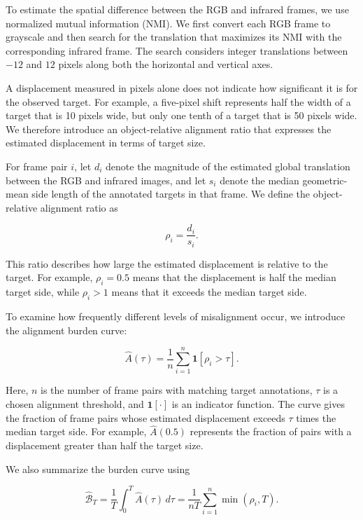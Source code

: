 \documentclass[10pt]{article}
\newcommand{\burden}{\widehat A}
\begin{document}
To estimate the spatial difference between the RGB and infrared frames, we use normalized mutual information (NMI). We first convert each RGB frame to grayscale and then search for the translation that maximizes its NMI with the corresponding infrared frame. The search considers integer translations between $-12$ and $12$ pixels along both the horizontal and vertical axes.

A displacement measured in pixels alone does not indicate how significant it is for the observed target. For example, a five-pixel shift represents half the width of a target that is 10 pixels wide, but only one tenth of a target that is 50 pixels wide. We therefore introduce an object-relative alignment ratio that expresses the estimated displacement in terms of target size.

For frame pair $i$, let $d_i$ denote the magnitude of the estimated global translation between the RGB and infrared images, and let $s_i$ denote the median geometric-mean side length of the annotated targets in that frame. We define the object-relative alignment ratio as

\begin{equation}
\rho_i=\frac{d_i}{s_i}.
\label{eq:rho}
\end{equation}

This ratio describes how large the estimated displacement is relative to the target. For example, $\rho_i=0.5$ means that the displacement is half the median target side, while $\rho_i>1$ means that it exceeds the median target side.

To examine how frequently different levels of misalignment occur, we introduce the alignment burden curve:

\begin{equation}
\burden(\tau)=\frac{1}{n}\sum_{i=1}^{n}\mathbf{1}[\rho_i>\tau].
\label{eq:burden}
\end{equation}

Here, $n$ is the number of frame pairs with matching target annotations, $\tau$ is a chosen alignment threshold, and $\mathbf{1}[\cdot]$ is an indicator function. The curve gives the fraction of frame pairs whose estimated displacement exceeds $\tau$ times the median target side. For example, $\burden(0.5)$ represents the fraction of pairs with a displacement greater than half the target size.

We also summarize the burden curve using

\begin{equation}
\widehat{\mathcal B}_T=\frac{1}{T}\int_0^T\burden(\tau)\,d\tau
=\frac{1}{nT}\sum_{i=1}^n\min(\rho_i,T).
\label{eq:burdenscore}
\end{equation}
\end{document}
